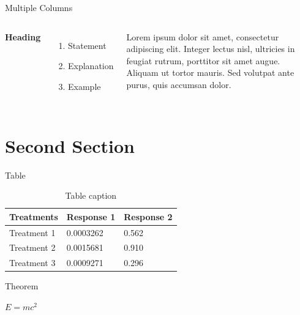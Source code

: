 \begin{frame}{Multiple Columns}
    \begin{columns}[c] %

        \textbf{Heading}
        \begin{enumerate}
            \item Statement
            \item Explanation
            \item Example
        \end{enumerate}

        Lorem ipsum dolor sit amet, consectetur adipiscing elit. Integer lectus nisl, ultricies in feugiat rutrum, porttitor sit amet augue. Aliquam ut tortor mauris. Sed volutpat ante purus, quis accumsan dolor.

    \end{columns}
\end{frame}

\section{Second Section}

\begin{frame}{Table}
    \begin{table}
        \begin{tabular}{l l l}
            \toprule
            \textbf{Treatments} & \textbf{Response 1} & \textbf{Response 2} \\
            \midrule
            Treatment 1         & 0.0003262           & 0.562               \\
            Treatment 2         & 0.0015681           & 0.910               \\
            Treatment 3         & 0.0009271           & 0.296               \\
            \bottomrule
        \end{tabular}
        \caption{Table caption}
    \end{table}
\end{frame}


\begin{frame}{Theorem}
    \begin{theorem}
        $E = mc^2$
    \end{theorem}
\end{frame}

